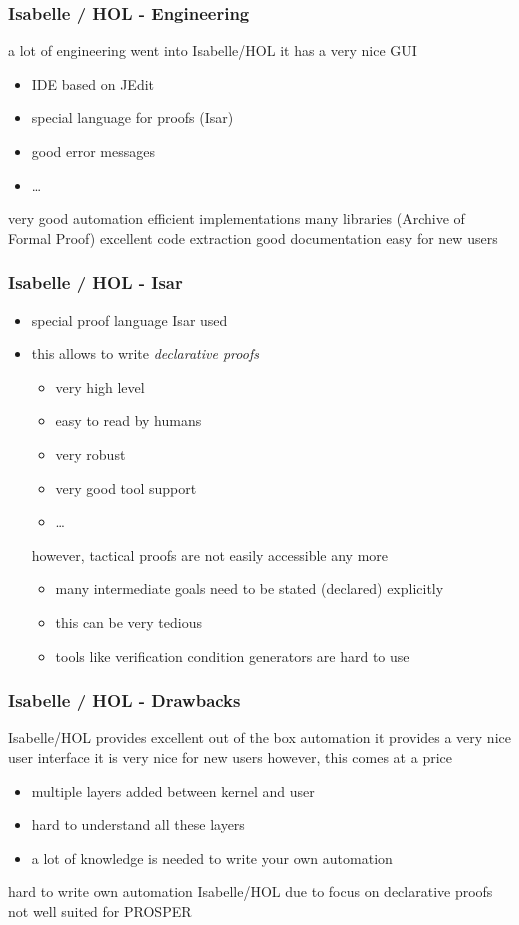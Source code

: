 \begin{frame}
\frametitle{Isabelle / HOL - Engineering}

\begin{itemize}
\pro a lot of engineering went into Isabelle/HOL
\pro it has a very nice GUI
\begin{itemize}
\item IDE based on JEdit
\item special language for proofs (Isar)
\item good error messages
\item \ldots
\end{itemize}
\pro very good automation
\pro efficient implementations
\pro many libraries (Archive of Formal Proof)
\pro excellent code extraction
\pro good documentation
\pro easy for new users
\end{itemize}
\end{frame}


\begin{frame}
\frametitle{Isabelle / HOL - Isar}

\begin{itemize}
\item special proof language Isar used
\item this allows to write \emph{declarative proofs}
\begin{itemize}
\item very high level 
\item easy to read by humans
\item very robust 
\item very good tool support
\item \ldots
\end{itemize}
\con however, tactical proofs are not easily accessible any more
\begin{itemize}
\item many intermediate goals need to be stated (declared) explicitly
\item this can be very tedious
\item tools like verification condition generators are hard to use
\end{itemize}
\end{itemize}
\end{frame}

\begin{frame}
\frametitle{Isabelle / HOL - Drawbacks}

\begin{itemize}
\pro Isabelle/HOL provides excellent out of the box automation
\pro it provides a very nice user interface
\pro it is very nice for new users
\con however, this comes at a price
\begin{itemize}
\item multiple layers added between kernel and user
\item hard to understand all these layers
\item a lot of knowledge is needed to write your own automation
\end{itemize}
\con hard to write own automation
\con Isabelle/HOL due to focus on declarative proofs not well suited for \eg PROSPER
\end{itemize}
\end{frame}

